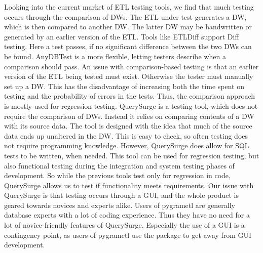 Looking into the current market of ETL testing tools, we find that much testing occurs through the comparison of DWs. The ETL under test generates a DW, which is then compared to another DW. The latter DW may be handwritten or generated by an earlier version of the ETL. Tools like ETLDiff support Diff testing. Here a test passes, if no significant difference between the two DWs can be found. AnyDBTest is a more flexible, letting testers describe when a comparison should pass. An issue with comparison-based testing is that an earlier version of the ETL being tested must exist. Otherwise the tester must manually set up a DW. This has the disadvantage of increasing both the time spent on testing and the probability of errors in the tests. Thus, the comparison approach is mostly used for  regression testing. QuerySurge is a testing tool, which does not require the comparison of DWs. Instead it relies on comparing contents of a DW with its source data. The tool is designed with the idea that much of the source data ends up unaltered in the DW. This is easy to check, so often testing does not require programming knowledge. However, QuerySurge does allow for SQL tests to be written, when needed. This tool can be used for regression testing, but also functional testing during the integration and system testing phases of development. So while the previous tools test only for regression in code, QuerySurge allows us to test if functionality meets requirements. Our issue with QuerySurge is that testing occurs through a GUI, and the whole product is geared towards novices and experts alike. Users of pygrametl are generally database experts with a lot of coding experience. Thus they have no need for a lot of novice-friendly features of QuerySurge. Especially the use of a GUI is a contingency point, as users of pygrametl use the package to get away from GUI development. 

